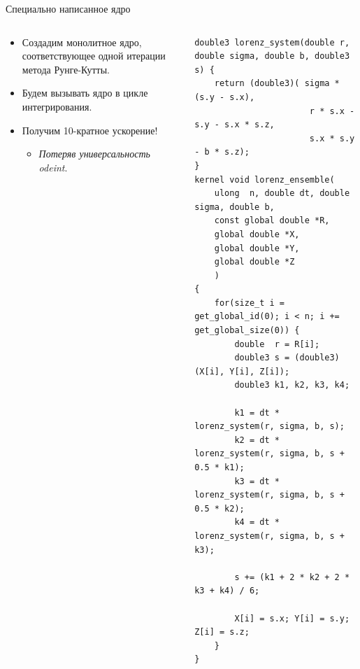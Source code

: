 \documentclass[@BEAMER_OPTIONS@]{beamer}
\begin{document}
\begin{frame}[fragile]{Специально написанное ядро}
    \begin{columns}
        \begin{column}{0.45\textwidth}
            \begin{itemize}
                \item Создадим монолитное ядро, соответствующее одной итерации
                    метода Рунге-Кутты.
                \item Будем вызывать ядро в цикле интегрирования.
                    \vspace{\baselineskip}
                \item Получим 10-кратное ускорение!
                    \begin{itemize}
                        \item<2|alert@2> \emph{Потеряв универсальность odeint}.
                    \end{itemize}
            \end{itemize}
        \end{column} \quad \quad
        \begin{column}{0.5\textwidth}
            \begin{exampleblock}{}
                \begin{adjustbox}{width=0.95\textwidth,height=0.95\textheight,keepaspectratio}
                    \begin{lstlisting}
double3 lorenz_system(double r, double sigma, double b, double3 s) {
    return (double3)( sigma * (s.y - s.x),
                       r * s.x - s.y - s.x * s.z,
                       s.x * s.y - b * s.z);
}
kernel void lorenz_ensemble(
    ulong  n, double dt, double sigma, double b,
    const global double *R,
    global double *X,
    global double *Y,
    global double *Z
    )
{
    for(size_t i = get_global_id(0); i < n; i += get_global_size(0)) {
        double  r = R[i];
        double3 s = (double3)(X[i], Y[i], Z[i]);
        double3 k1, k2, k3, k4;

        k1 = dt * lorenz_system(r, sigma, b, s);
        k2 = dt * lorenz_system(r, sigma, b, s + 0.5 * k1);
        k3 = dt * lorenz_system(r, sigma, b, s + 0.5 * k2);
        k4 = dt * lorenz_system(r, sigma, b, s + k3);

        s += (k1 + 2 * k2 + 2 * k3 + k4) / 6;

        X[i] = s.x; Y[i] = s.y; Z[i] = s.z;
    }
}
                    \end{lstlisting}
                \end{adjustbox}
            \end{exampleblock}
        \end{column}
    \end{columns}
\end{frame}
\end{document}
